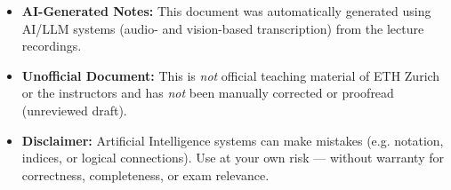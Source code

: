 \documentclass[11pt,a4paper]{report}
\theoremstyle{purplethm}
\theoremstyle{defthm}
\theoremstyle{examplethm}
\theoremstyle{remarkthm}
\theoremstyle{questionthm}
\theoremstyle{importantremarkthm}
\theoremstyle{purplethm}
\begin{document}
\begin{titlepage}
\begin{minipage}{\textwidth}
\begin{tcolorbox}[
        arc=6pt,
        boxrule=0.7pt,
        colback=MidnightBlue!3!white,
        colframe=MidnightBlue!30!white,
        left=10pt, right=10pt, top=8pt, bottom=8pt
    ]
    \vspace{0.25cm}
    \sffamily\small\color{black!75}
    \begin{itemize}[leftmargin=1.5em, itemsep=3pt, topsep=0pt, parsep=0pt]
        \item[\textcolor{MidnightBlue!80!black}{\small\faRobot}] \textbf{AI-Generated Notes:} This document was automatically generated using AI/LLM systems (audio- and vision-based transcription) from the lecture recordings.
        \item[\textcolor{MidnightBlue!80!black}{\small\faUserShield}] \textbf{Unofficial Document:} This is \emph{not} official teaching material of ETH Zurich or the instructors and has \emph{not} been manually corrected or proofread (unreviewed draft).
        \item[\textcolor{MidnightBlue!80!black}{\small\faExclamationTriangle}] \textbf{Disclaimer:} Artificial Intelligence systems can make mistakes (e.g. notation, indices, or logical connections). Use at your own risk --- without warranty for correctness, completeness, or exam relevance.
    \end{itemize}
    \end{tcolorbox}
\end{minipage}
\vspace*{0.5cm}
\end{titlepage}

\cleardoublepage
{}
\tableofcontents
\cleardoublepage










\enddocument
\end{document}
